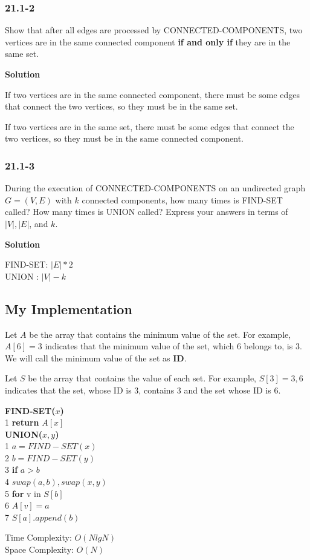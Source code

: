 \subsubsection {21.1-2}

Show that after all edges are processed by CONNECTED-COMPONENTS, two vertices
are in the same connected component \textbf{if and only if} they are in the same
set.

\textbf{Solution}

If two vertices are in the same connected component, there must be some edges
that connect the two vertices, so they must be in the same set.

If two vertices are in the same set, there must be some edges that connect the
two vertices, so they must be in the same connected component.

\subsubsection {21.1-3}

During the execution of CONNECTED-COMPONENTS on an undirected graph $G = (V, E)$
with $k$ connected components, how many times is FIND-SET called? How many times
is UNION called? Express your answers in terms of $|V|, |E|$, and $k$.

\textbf{Solution}

FIND-SET: $|E| * 2$\\
UNION   : $|V| - k$

\subsection {My Implementation}

Let $A$ be the array that contains the minimum value of the set. For example,
$A[6] = 3$ indicates that the minimum value of the set, which $6$ belongs to, is
$3$. We will call the minimum value of the set as \textbf{ID}.

Let $S$ be the array that contains the value of each set. For example,
$S[3]=3, 6$ indicates that the set, whose ID is $3$, contains $3$ and the set
whose ID is $6$.

\textbf{FIND-SET($x$)}\\
1\hspace*{2ex} \textbf{return} $A[x]$\\

\textbf{UNION($x, y$)}\\
1\hspace*{2ex} $a = FIND-SET(x)$\\
2\hspace*{2ex} $b = FIND-SET(y)$\\
3\hspace*{2ex} \textbf{if} $a > b$\\
4\hspace*{4ex} $swap(a, b), swap(x, y)$\\
5\hspace*{2ex} \textbf{for} v in $S[b]$\\
6\hspace*{4ex} $A[v] = a$\\
7\hspace*{2ex} $S[a].append(b)$

Time Complexity: $O(NlgN)$\\
Space Complexity: $O(N)$


